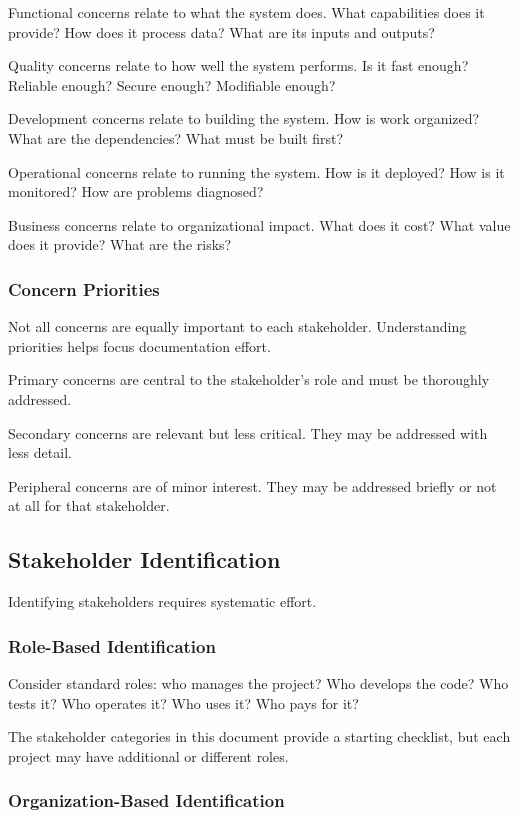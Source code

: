 \documentclass[11pt]{article}
\begin{document}
Functional concerns relate to what the system does. What capabilities does it provide? How does it process data? What are its inputs and outputs?

Quality concerns relate to how well the system performs. Is it fast enough? Reliable enough? Secure enough? Modifiable enough?

Development concerns relate to building the system. How is work organized? What are the dependencies? What must be built first?

Operational concerns relate to running the system. How is it deployed? How is it monitored? How are problems diagnosed?

Business concerns relate to organizational impact. What does it cost? What value does it provide? What are the risks?

\subsubsection{Concern Priorities}

Not all concerns are equally important to each stakeholder. Understanding priorities helps focus documentation effort.

Primary concerns are central to the stakeholder's role and must be thoroughly addressed.

Secondary concerns are relevant but less critical. They may be addressed with less detail.

Peripheral concerns are of minor interest. They may be addressed briefly or not at all for that stakeholder.

\subsection{Stakeholder Identification}

Identifying stakeholders requires systematic effort.

\subsubsection{Role-Based Identification}

Consider standard roles: who manages the project? Who develops the code? Who tests it? Who operates it? Who uses it? Who pays for it?

The stakeholder categories in this document provide a starting checklist, but each project may have additional or different roles.

\subsubsection{Organization-Based Identification}
\end{document}
